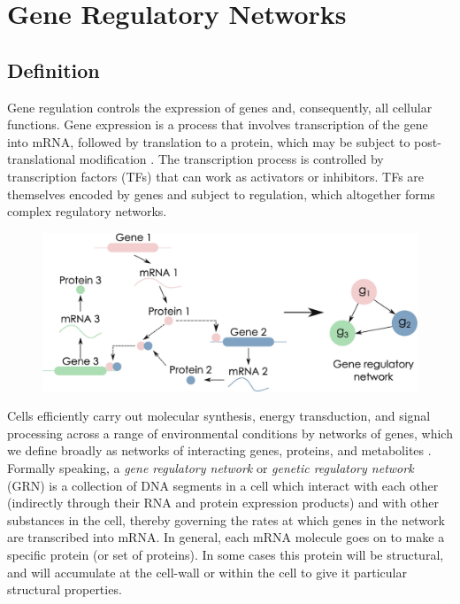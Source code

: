 \chapter{Gene Regulatory Networks}\label{grn}
\lhead[\fancyplain{}{\bfseries\thepage}]{\fancyplain{}{\bfseries\rightmark}}


\section{Definition}

Gene regulation controls the expression of genes and, consequently, all cellular functions. Gene expression is a process that involves transcription of the gene into mRNA, followed by translation to a protein, which may be subject to post-translational modification \cite{K40}. The transcription process is controlled by transcription factors (TFs) that can work as activators or inhibitors. TFs are themselves encoded by genes and subject to regulation, which altogether forms complex regulatory networks. 
\begin{figure}
\centering
\includegraphics{GRN.png}
\end{figure}
Cells efficiently carry out molecular synthesis, energy transduction, and signal processing across a range of environmental conditions by networks of genes, which we define broadly as networks of interacting genes, proteins, and metabolites \cite{K37}. Formally speaking, a \emph{gene regulatory network} or \emph{genetic regulatory network} (GRN) is a collection of DNA segments in a cell which interact with each other (indirectly through their RNA and protein expression products) and with other substances in the cell, thereby governing the rates at which genes in the network are transcribed into mRNA. In general, each mRNA molecule goes on to make a specific protein (or set of proteins). In some cases this protein will be structural, and will accumulate at the cell-wall or within the cell to give it particular structural properties. 

